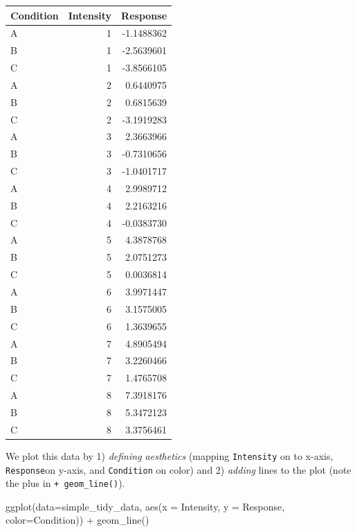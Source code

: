 \documentclass[
]{book}
\newenvironment{Shaded}{\begin{snugshade}}{\end{snugshade}}
\newcommand{\AttributeTok}[1]{\textcolor[rgb]{0.77,0.63,0.00}{#1}}
\newcommand{\FunctionTok}[1]{\textcolor[rgb]{0.00,0.00,0.00}{#1}}
\newcommand{\NormalTok}[1]{#1}
\newcommand{\SpecialCharTok}[1]{\textcolor[rgb]{0.00,0.00,0.00}{#1}}
\begin{document}
\begin{tabular}{l|r|r}
\hline
Condition & Intensity & Response\\
\hline
A & 1 & -1.1488362\\
\hline
B & 1 & -2.5639601\\
\hline
C & 1 & -3.8566105\\
\hline
A & 2 & 0.6440975\\
\hline
B & 2 & 0.6815639\\
\hline
C & 2 & -3.1919283\\
\hline
A & 3 & 2.3663966\\
\hline
B & 3 & -0.7310656\\
\hline
C & 3 & -1.0401717\\
\hline
A & 4 & 2.9989712\\
\hline
B & 4 & 2.2163216\\
\hline
C & 4 & -0.0383730\\
\hline
A & 5 & 4.3878768\\
\hline
B & 5 & 2.0751273\\
\hline
C & 5 & 0.0036814\\
\hline
A & 6 & 3.9971447\\
\hline
B & 6 & 3.1575005\\
\hline
C & 6 & 1.3639655\\
\hline
A & 7 & 4.8905494\\
\hline
B & 7 & 3.2260466\\
\hline
C & 7 & 1.4765708\\
\hline
A & 8 & 7.3918176\\
\hline
B & 8 & 5.3472123\\
\hline
C & 8 & 3.3756461\\
\hline
\end{tabular}

We plot this data by 1) \emph{defining aesthetics} (mapping \texttt{Intensity} on to x-axis, \texttt{Response}on y-axis, and \texttt{Condition} on color) and 2) \emph{adding} lines to the plot (note the plus in \texttt{+\ geom\_line()}).

\begin{Shaded}
\begin{Highlighting}[]
\FunctionTok{ggplot}\NormalTok{(}\AttributeTok{data=}\NormalTok{simple\_tidy\_data, }\FunctionTok{aes}\NormalTok{(}\AttributeTok{x =}\NormalTok{ Intensity, }\AttributeTok{y =}\NormalTok{ Response, }\AttributeTok{color=}\NormalTok{Condition)) }\SpecialCharTok{+} 
  \FunctionTok{geom\_line}\NormalTok{()}
\end{Highlighting}
\end{Shaded}
\end{document}
